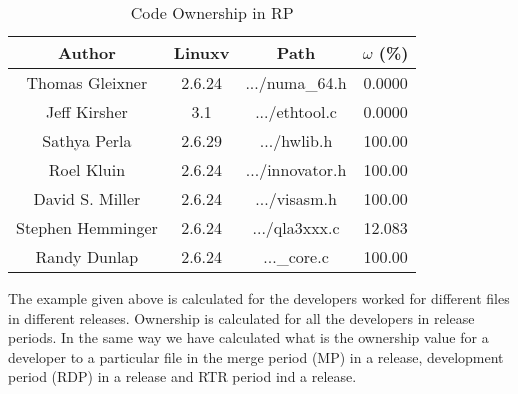 \documentclass{acm_proc_article-sp}
\begin{document}
\begin{table}[ht]
\caption{Code Ownership in RP}  %
\centering 						%
\begin{tabular}{c c c c}				%
\hline\hline						%
Author 				& Linuxv		& Path				& $\omega$ (\%) \\ [0.5ex]
\hline 							%
Thomas Gleixner		& 2.6.24		& .../numa\_64.h	& 0.0000\\
Jeff Kirsher			& 3.1		& .../ethtool.c		& 0.0000\\
Sathya Perla			& 2.6.29		& .../hwlib.h		& 100.00\\
Roel Kluin			& 2.6.24		& .../innovator.h 	& 100.00\\
David S. Miller		& 2.6.24		& .../visasm.h 		& 100.00\\
Stephen Hemminger	& 2.6.24		& .../qla3xxx.c	 	& 12.083\\
Randy Dunlap			& 2.6.24		& ...\_core.c 		& 100.00\\
[1ex]							%
\hline 							%
\end{tabular}
\label{table:nonlin} 				%
\end{table}
The example given above is calculated for the developers worked for different files in different releases. Ownership is calculated for all the developers in release periods. In the same way we have calculated what is the ownership value for a developer to a particular file in the merge period (MP) in a release, development period (RDP) in a release and RTR period ind a release.
\end{document}
